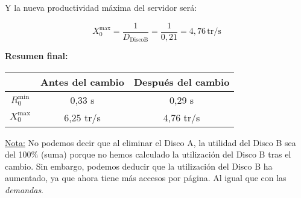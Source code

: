 \documentclass[a4paper,12pt]{article}
\begin{document}
\begin{enumerate}
Y la nueva productividad máxima del servidor será:

\[
X_0^{\text{max}} = \frac{1}{D_{\text{DiscoB}}} = \frac{1}{0{,}21} = \boxed{4{,}76 \, \text{tr/s}}
\]

\vspace{0.5em}

\textbf{Resumen final:}

\begin{center}
\begin{tabular}{|c|c|c|}
\hline
& \textbf{Antes del cambio} & \textbf{Después del cambio} \\
\hline
$R_0^{\text{min}}$ & 0{,}33 s & 0{,}29 s \\
$X_0^{\text{max}}$ & 6{,}25 tr/s & 4{,}76 tr/s \\
\hline
\end{tabular}
\end{center}

\underline{Nota:} No podemos decir que al eliminar el Disco A, la utilidad del Disco B sea del 100\% (suma) porque no hemos calculado la utilización del Disco B tras el cambio. Sin embargo, podemos deducir que la utilización del Disco B ha aumentado, ya que ahora tiene más accesos por página. Al igual que con las \textit{demandas}.


\end{enumerate}
\end{document}
